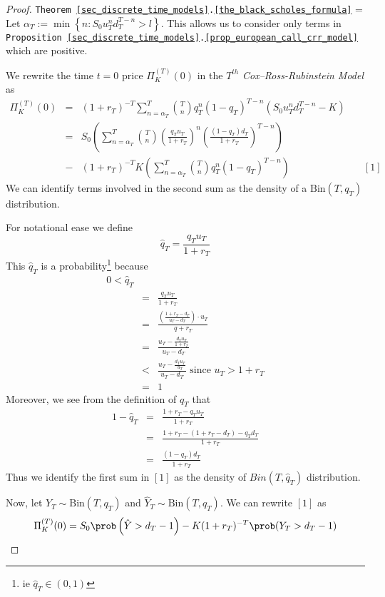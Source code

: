 \documentclass[11pt,a4paper]{article}
\begin{document}
\begin{proof}{\texttt{Theorem  \ref{sec_discrete_time_models}.\ref{the_black_scholes_formula}}}
  \everymath={\displaystyle}
  Let $\alpha_T:=\min\left\{n:S_0u_T^nd_T^{T-n}>l\right\}$. This allows us to consider only terms in \texttt{Proposition \ref{sec_discrete_time_models}.\ref{prop_european_call_crr_model}} which are positive.
  \par We rewrite the time $t=0$ price $\Pi_K^{(T)}(0)$ in the $T^{th}$ \textit{Cox--Ross-Rubinstein Model} as
  \[\begin{array}{rcll}
    \Pi_K^{(T)}(0)&=&(1+r_T)^{-T}\sum_{n=\alpha_T}^T{T \choose n}q_T^n(1-q_T)^{T-n}(S_0u_T^nd_T^{T-n}-K)\\
    &=&S_0\left(\sum_{n=\alpha_T}^T{T\choose n}\left(\frac{q_Tu_T}{1+r_T}\right)^n\left(\frac{(1-q_T)d_T}{1+r_T}\right)^{T-n}\right)\\
    &-&(1+r_T)^{-T}K\left(\sum_{n=\alpha_T}^T{T\choose n}q_T^n(1-q_T)^{T-n}\right)&\quad[1]
  \end{array}\]
  We can identify terms involved in the second sum as the density of a $\text{Bin}(T,q_T)$ distribution.
  \par For notational ease we define
  \[ \hat{q}_T=\frac{q_Tu_T}{1+r_T} \]
  This $\hat{q}_T$ is a probability\footnote{ie $\hat{q}_T\in(0,1)$} because
  \[\begin{array}{rcl}
    0<\hat{q}_T\\
    &=&\frac{q_Tu_T}{1+r_T}\\
    &=&\frac{\left(\frac{1+r_T-d_T}{u_T-d_T}\right)\cdot u_T}{q+r_T}\\
    &=&\frac{u_T-\frac{d_Tu_T}{1+r_T}}{u_T-d_T}\\
    &<&\frac{u_T-\frac{d_Tu_T}{u_T}}{u_T-d_T}\text{ since }u_T>1+r_T\\
    &=&1
  \end{array}\]
  Moreover, we see from the definition of $q_T$ that
  \[\begin{array}{rcl}
    1-\hat{q}_T&=&\frac{1+r_T-q_Tu_T}{1+r_T}\\
    &=&\frac{1+r_T-(1+r_T-d_T)-q_Td_T}{1+r_T}\\
    &=&\frac{(1-q_T)d_T}{1+r_T}
  \end{array}\]
  Thus we identify the first sum in $[1]$ as the density of $Bin(T,\hat{q}_T)$ distribution.
  \par Now, let $Y_T\sim\text{Bin}(T,q_T)$ and $\hat{Y}_T\sim\text{Bin}(T,\hat{q}_T)$. We can rewrite $[1]$ as
  \[ \Pi_K^{(T)}(0)=S_0\prob\left(\hat{Y}>d_T-1\right)-K(1+r_T)^{-T}\prob(Y_T>d_T-1) \]

\end{proof}
\end{document}
